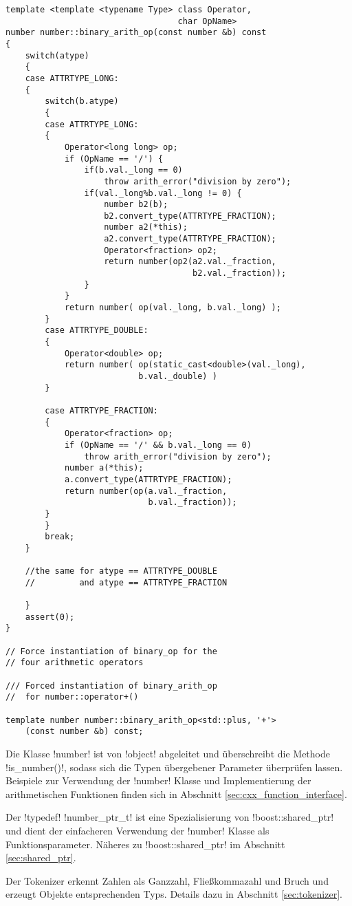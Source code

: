 \begin{lstlisting}[caption={Arithmetische Operatoren}, label=lst:op_template]
template <template <typename Type> class Operator,
                                   char OpName>
number number::binary_arith_op(const number &b) const
{
    switch(atype)
    {
    case ATTRTYPE_LONG:
    {
        switch(b.atype)
        {
        case ATTRTYPE_LONG:
        {
            Operator<long long> op;
            if (OpName == '/') {
                if(b.val._long == 0)
                    throw arith_error("division by zero");
                if(val._long%b.val._long != 0) {
                    number b2(b);
                    b2.convert_type(ATTRTYPE_FRACTION);
                    number a2(*this);
                    a2.convert_type(ATTRTYPE_FRACTION);
                    Operator<fraction> op2;
                    return number(op2(a2.val._fraction,
                                      b2.val._fraction));
                }
            }
            return number( op(val._long, b.val._long) );
        }
        case ATTRTYPE_DOUBLE:
        {
            Operator<double> op;
            return number( op(static_cast<double>(val._long),
                           b.val._double) )
        }

        case ATTRTYPE_FRACTION:
        {
            Operator<fraction> op;
            if (OpName == '/' && b.val._long == 0)
                throw arith_error("division by zero");
            number a(*this);
            a.convert_type(ATTRTYPE_FRACTION);
            return number(op(a.val._fraction,
                             b.val._fraction));
        }
        }
        break;
    }

    //the same for atype == ATTRTYPE_DOUBLE
    //         and atype == ATTRTYPE_FRACTION

    }
    assert(0);
}

// Force instantiation of binary_op for the
// four arithmetic operators

/// Forced instantiation of binary_arith_op
//  for number::operator+()

template number number::binary_arith_op<std::plus, '+'>
    (const number &b) const;
\end{lstlisting}
Die Klasse !number! ist von !object! abgeleitet und überschreibt die Methode !is_number()!, sodass sich die Typen übergebener Parameter überprüfen lassen. Beispiele zur Verwendung der !number! Klasse und Implementierung der arithmetischen Funktionen finden sich in Abschnitt \ref{sec:cxx_function_interface}.

Der !typedef! !number_ptr_t! ist eine Spezialisierung von !boost::shared_ptr! und dient der einfacheren Verwendung der !number! Klasse als Funktionsparameter. Näheres zu !boost::shared_ptr! im Abschnitt \ref{sec:shared_ptr}.

Der Tokenizer erkennt Zahlen als Ganzzahl, Fließkommazahl und Bruch und erzeugt Objekte entsprechenden Typs. Details dazu in Abschnitt \ref{sec:tokenizer}.